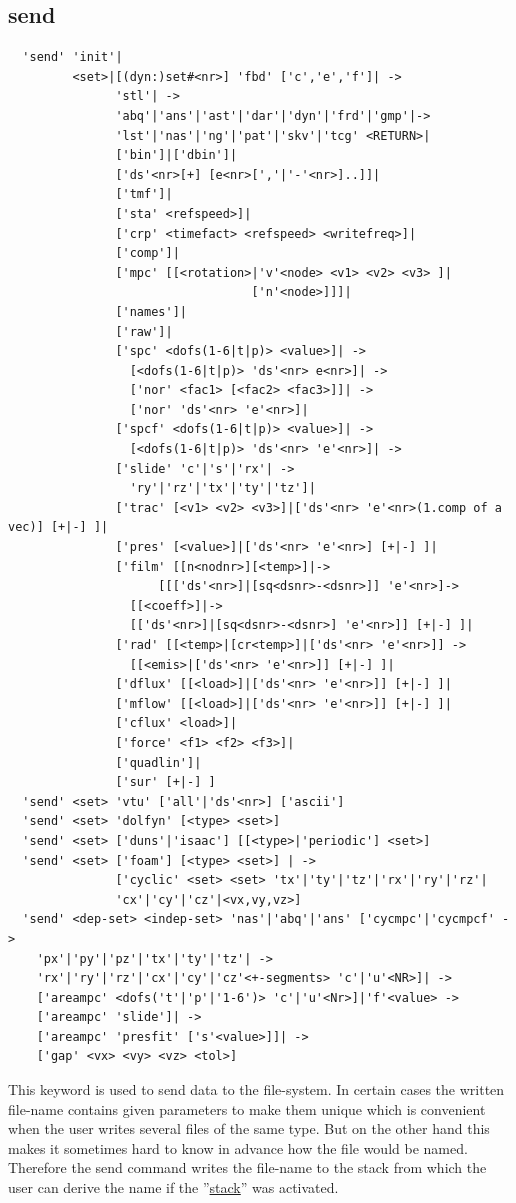 \documentclass{article}
\providecommand{\htmlref}[2]{\hyperref[#2]{#1}}
\begin{document}
\subsection{\label{send}send}
\begin{verbatim}
  'send' 'init'|
         <set>|[(dyn:)set#<nr>] 'fbd' ['c','e','f']| ->
               'stl'| ->
               'abq'|'ans'|'ast'|'dar'|'dyn'|'frd'|'gmp'|->
               'lst'|'nas'|'ng'|'pat'|'skv'|'tcg' <RETURN>|
               ['bin']|['dbin']|
               ['ds'<nr>[+] [e<nr>[','|'-'<nr>]..]]|
               ['tmf']|
               ['sta' <refspeed>]|
               ['crp' <timefact> <refspeed> <writefreq>]|
               ['comp']|
               ['mpc' [[<rotation>|'v'<node> <v1> <v2> <v3> ]|
                                  ['n'<node>]]]|
               ['names']|
               ['raw']|
               ['spc' <dofs(1-6|t|p)> <value>]| ->
                 [<dofs(1-6|t|p)> 'ds'<nr> e<nr>]| ->
                 ['nor' <fac1> [<fac2> <fac3>]]| ->
                 ['nor' 'ds'<nr> 'e'<nr>]|
               ['spcf' <dofs(1-6|t|p)> <value>]| ->
                 [<dofs(1-6|t|p)> 'ds'<nr> 'e'<nr>]| ->
               ['slide' 'c'|'s'|'rx'| ->
                 'ry'|'rz'|'tx'|'ty'|'tz']|
               ['trac' [<v1> <v2> <v3>]|['ds'<nr> 'e'<nr>(1.comp of a vec)] [+|-] ]|
               ['pres' [<value>]|['ds'<nr> 'e'<nr>] [+|-] ]|
               ['film' [[n<nodnr>][<temp>]|->
                     [[['ds'<nr>]|[sq<dsnr>-<dsnr>]] 'e'<nr>]->
                 [[<coeff>]|->
                 [['ds'<nr>]|[sq<dsnr>-<dsnr>] 'e'<nr>]] [+|-] ]| 
               ['rad' [[<temp>|[cr<temp>]|['ds'<nr> 'e'<nr>]] ->
                 [[<emis>|['ds'<nr> 'e'<nr>]] [+|-] ]|
               ['dflux' [[<load>]|['ds'<nr> 'e'<nr>]] [+|-] ]|
               ['mflow' [[<load>]|['ds'<nr> 'e'<nr>]] [+|-] ]|
               ['cflux' <load>]| 
               ['force' <f1> <f2> <f3>]|
               ['quadlin']|
               ['sur' [+|-] ]
  'send' <set> 'vtu' ['all'|'ds'<nr>] ['ascii']
  'send' <set> 'dolfyn' [<type> <set>] 
  'send' <set> ['duns'|'isaac'] [[<type>|'periodic'] <set>] 
  'send' <set> ['foam'] [<type> <set>] | ->
               ['cyclic' <set> <set> 'tx'|'ty'|'tz'|'rx'|'ry'|'rz'|
               'cx'|'cy'|'cz'|<vx,vy,vz>] 
  'send' <dep-set> <indep-set> 'nas'|'abq'|'ans' ['cycmpc'|'cycmpcf' ->
    'px'|'py'|'pz'|'tx'|'ty'|'tz'| ->
    'rx'|'ry'|'rz'|'cx'|'cy'|'cz'<+-segments> 'c'|'u'<NR>]| ->
    ['areampc' <dofs('t'|'p'|'1-6')> 'c'|'u'<Nr>]|'f'<value> ->
    ['areampc' 'slide']| ->
    ['areampc' 'presfit' ['s'<value>]]| ->
    ['gap' <vx> <vy> <vz> <tol>] 
\end{verbatim}
This keyword is used to send data to the file-system. In certain cases the written file-name contains given parameters to make them unique which is convenient when the user writes several files of the same type. But on the other hand this makes it sometimes hard to know in advance how the file would be named. Therefore the send command writes the file-name to the stack from which the user can derive the name if the ''\htmlref{stack}{stack}'' was activated.
\end{document}

